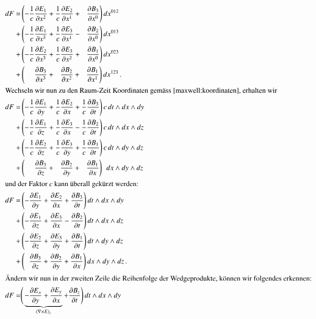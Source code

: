 \begin{align*}
	dF =
	&\left( - \frac{1}{c} \frac{\d E_1}{\d x^2} + \frac{1}{c} \frac{\d E_2}{\d x^1} + \phantom{\frac{1}{c}} \frac{\d B_3}{\d x^0} \right) dx^{012}
	\\
	+&\left( - \frac{1}{c} \frac{\d E_1}{\d x^3} + \frac{1}{c} \frac{\d E_3}{\d x^1} - \phantom{\frac{1}{c}} \frac{\d B_2}{\d x^0} \right) dx^{013}
	\\
	+&\left( - \frac{1}{c} \frac{\d E_2}{\d x^3} + \frac{1}{c} \frac{\d E_3}{\d x^2} + \phantom{\frac{1}{c}} \frac{\d B_1}{\d x^0} \right) dx^{023}
	\\
	+&\left( \phantom{+} \phantom{\frac{1}{c}} \frac{\d B_3}{\d x^3} + \phantom{\frac{1}{c}} \frac{\d B_2}{\d x^2} + \phantom{\frac{1}{c}} \frac{\d B_1}{\d x^1} \right) dx^{123} \, .
	\\
	\intertext{Wechseln wir nun zu den Raum-Zeit Koordinaten gemäss \eqref{maxwell:koordinaten}, erhalten wir}
	dF =
	&\left( - \frac{1}{c} \frac{\d E_1}{\d y} + \frac{1}{c} \frac{\d E_2}{\d x} + \frac{1}{c} \frac{\d B_3}{\d t} \right) c \, dt \wedge dx \wedge dy
	\\
	+&\left( - \frac{1}{c} \frac{\d E_1}{\d z} + \frac{1}{c} \frac{\d E_3}{\d x} - \frac{1}{c} \frac{\d B_2}{\d t} \right) c \, dt \wedge dx \wedge dz
	\\
	+&\left( - \frac{1}{c} \frac{\d E_2}{\d z} + \frac{1}{c} \frac{\d E_3}{\d y} + \frac{1}{c} \frac{\d B_1}{\d t} \right) c\, dt \wedge dy \wedge dz
	\\
	+&\left( \phantom{+} \phantom{\frac{1}{c}} \frac{\d B_3}{\d z} + \phantom{\frac{1}{c}} \frac{\d B_2}{\d y} + \phantom{\frac{1}{c}} \frac{\d B_1}{\d x} \right) \phantom{c} dx \wedge dy \wedge dz
	\\
	\intertext{und der Faktor $c$ kann überall gekürzt werden:}
	dF =
	&\left( -  \frac{\d E_1}{\d y} +  \frac{\d E_2}{\d x} +  \frac{\d B_3}{\d t} \right) dt \wedge dx \wedge dy
	\\
	+&\left( -  \frac{\d E_1}{\d z} +  \frac{\d E_3}{\d x} -  \frac{\d B_2}{\d t} \right)dt \wedge dx \wedge dz
	\\
	+&\left( -  \frac{\d E_2}{\d z} +  \frac{\d E_3}{\d y} +  \frac{\d B_1}{\d t} \right)dt \wedge dy \wedge dz
	\\
	+&\left( \phantom{+}  \frac{\d B_3}{\d z} +  \frac{\d B_2}{\d y} +  \frac{\d B_1}{\d x} \right) dx \wedge dy \wedge dz \, .
	\\
	\intertext{Ändern wir nun in der zweiten Zeile die Reihenfolge der Wedgeprodukte, können wir folgendes erkennen:}
	dF =
	&\Bigg( \underbrace{ - \frac{\d E_x}{\d y} + \frac{\d E_y}{\d x}}_{(\nabla \times E)_z} + \frac{\d B_z}{\d t} \Bigg) \, dt \wedge dx \wedge dy

\end{align*}
